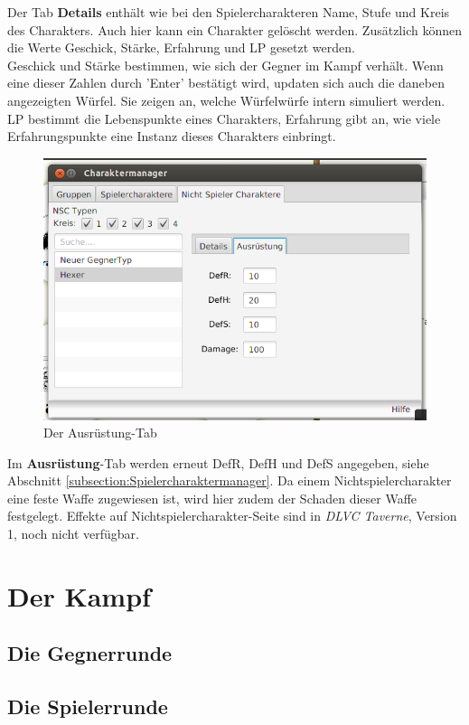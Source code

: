 \documentclass[11pt, a4paper, german]{article}
\begin{document}
Der Tab \textbf{Details} enthält wie bei den Spielercharakteren Name, Stufe und Kreis des Charakters. Auch hier kann ein Charakter gelöscht werden. 
Zusätzlich können die Werte Geschick, Stärke, Erfahrung und LP gesetzt werden.\\
 Geschick und Stärke bestimmen, wie sich der Gegner im Kampf verhält. Wenn eine dieser Zahlen durch 'Enter' bestätigt wird, updaten sich auch die daneben angezeigten Würfel. 
Sie zeigen an, welche Würfelwürfe intern simuliert werden. LP bestimmt die Lebenspunkte eines Charakters, Erfahrung gibt an, wie viele Erfahrungspunkte eine Instanz dieses Charakters einbringt.\\
\begin{figure}
\centering
\includegraphics[width=1\linewidth]{Bilder/Nichtspielertypmanager2}
\caption{Der Ausrüstung-Tab}
\label{fig:Nichtspielertypmanager2}
\end{figure}

Im \textbf{Ausrüstung}-Tab werden erneut DefR, DefH und DefS angegeben, siehe Abschnitt \ref{subsection:Spielercharaktermanager}. 
Da einem Nichtspielercharakter eine feste Waffe zugewiesen ist, wird hier zudem der Schaden dieser Waffe festgelegt. Effekte auf Nichtspielercharakter-Seite sind in \textit{DLVC Taverne}, Version 1, noch nicht verfügbar.

\section{Der Kampf}
\subsection{Die Gegnerrunde}
\subsection{Die Spielerrunde}
\end{document}
